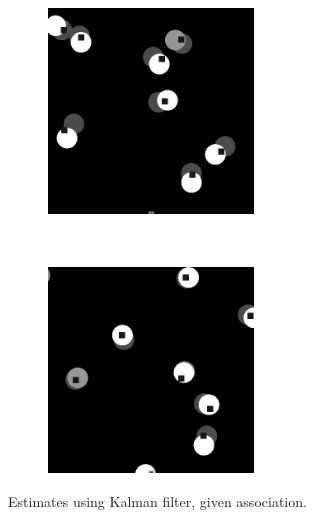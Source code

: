 \documentclass[a4paper]{article}
\begin{document}
\begin{figure}[h]
  \centering
  \begin{subfigure}{0.48\textwidth}
  \centering
  \includegraphics[width=0.6\textwidth]{images/kalman_1.png}
  \end{subfigure}~
  \begin{subfigure}{0.48\textwidth}
  \centering
  \includegraphics[width=0.6\textwidth]{images/kalman_2.png}
  \end{subfigure}
  \caption{Estimates using Kalman filter, given association.}
  \label{fig:kalman}
  \vspace{-2pt}
\end{figure}
\end{document}
